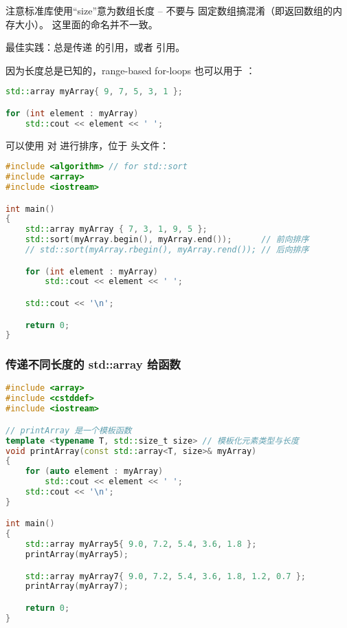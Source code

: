 \documentclass[../../LearnCpp.tex]{subfiles}
\begin{document}
注意标准库使用“size”意为数组长度 -- 不要与  固定数组搞混淆（即返回数组的内存大小）。
这里面的命名并不一致。

最佳实践：总是传递  的引用，或者  引用。

因为长度总是已知的，range-based for-loops 也可以用于 ：

\begin{lstlisting}[language=C++]
std::array myArray{ 9, 7, 5, 3, 1 };

for (int element : myArray)
    std::cout << element << ' ';
\end{lstlisting}

可以使用  对  进行排序，位于  头文件：

\begin{lstlisting}[language=C++]
#include <algorithm> // for std::sort
#include <array>
#include <iostream>

int main()
{
    std::array myArray { 7, 3, 1, 9, 5 };
    std::sort(myArray.begin(), myArray.end());      // 前向排序
    // std::sort(myArray.rbegin(), myArray.rend()); // 后向排序

    for (int element : myArray)
        std::cout << element << ' ';

    std::cout << '\n';

    return 0;
}
\end{lstlisting}

\subsubsection*{传递不同长度的 std::array 给函数}

\begin{lstlisting}[language=C++]
#include <array>
#include <cstddef>
#include <iostream>

// printArray 是一个模板函数
template <typename T, std::size_t size> // 模板化元素类型与长度
void printArray(const std::array<T, size>& myArray)
{
    for (auto element : myArray)
        std::cout << element << ' ';
    std::cout << '\n';
}

int main()
{
    std::array myArray5{ 9.0, 7.2, 5.4, 3.6, 1.8 };
    printArray(myArray5);

    std::array myArray7{ 9.0, 7.2, 5.4, 3.6, 1.8, 1.2, 0.7 };
    printArray(myArray7);

    return 0;
}
\end{lstlisting}
\end{document}

